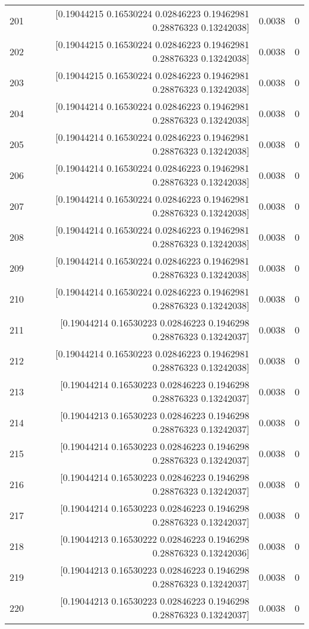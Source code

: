 \begin{longtable}{lrrr}
201 & [0.19044215 0.16530224 0.02846223 0.19462981 0.28876323 0.13242038] & 0.0038 & 0 \\
202 & [0.19044215 0.16530224 0.02846223 0.19462981 0.28876323 0.13242038] & 0.0038 & 0 \\
203 & [0.19044215 0.16530224 0.02846223 0.19462981 0.28876323 0.13242038] & 0.0038 & 0 \\
204 & [0.19044214 0.16530224 0.02846223 0.19462981 0.28876323 0.13242038] & 0.0038 & 0 \\
205 & [0.19044214 0.16530224 0.02846223 0.19462981 0.28876323 0.13242038] & 0.0038 & 0 \\
206 & [0.19044214 0.16530224 0.02846223 0.19462981 0.28876323 0.13242038] & 0.0038 & 0 \\
207 & [0.19044214 0.16530224 0.02846223 0.19462981 0.28876323 0.13242038] & 0.0038 & 0 \\
208 & [0.19044214 0.16530224 0.02846223 0.19462981 0.28876323 0.13242038] & 0.0038 & 0 \\
209 & [0.19044214 0.16530224 0.02846223 0.19462981 0.28876323 0.13242038] & 0.0038 & 0 \\
210 & [0.19044214 0.16530224 0.02846223 0.19462981 0.28876323 0.13242038] & 0.0038 & 0 \\
211 & [0.19044214 0.16530223 0.02846223 0.1946298  0.28876323 0.13242037] & 0.0038 & 0 \\
212 & [0.19044214 0.16530223 0.02846223 0.19462981 0.28876323 0.13242038] & 0.0038 & 0 \\
213 & [0.19044214 0.16530223 0.02846223 0.1946298  0.28876323 0.13242037] & 0.0038 & 0 \\
214 & [0.19044213 0.16530223 0.02846223 0.1946298  0.28876323 0.13242037] & 0.0038 & 0 \\
215 & [0.19044214 0.16530223 0.02846223 0.1946298  0.28876323 0.13242037] & 0.0038 & 0 \\
216 & [0.19044214 0.16530223 0.02846223 0.1946298  0.28876323 0.13242037] & 0.0038 & 0 \\
217 & [0.19044214 0.16530223 0.02846223 0.1946298  0.28876323 0.13242037] & 0.0038 & 0 \\
218 & [0.19044213 0.16530222 0.02846223 0.1946298  0.28876323 0.13242036] & 0.0038 & 0 \\
219 & [0.19044213 0.16530223 0.02846223 0.1946298  0.28876323 0.13242037] & 0.0038 & 0 \\
220 & [0.19044213 0.16530223 0.02846223 0.1946298  0.28876323 0.13242037] & 0.0038 & 0 \\

\end{longtable}
